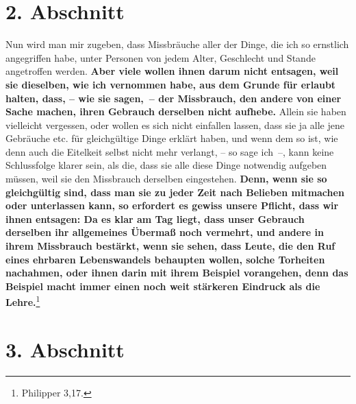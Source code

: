 \section{2. Abschnitt} \label{kap18_ab2}

Nun wird man mir zugeben, dass Missbräuche aller der Dinge, die ich so ernstlich
angegriffen habe, unter Personen von jedem Alter, Geschlecht und Stande
angetroffen werden. \label{ref:18_02_einwand}\textbf{Aber viele wollen ihnen
darum nicht entsagen, weil
sie
dieselben, wie ich vernommen habe, aus dem Grunde für erlaubt halten, dass, --
wie sie sagen,~-- der Missbrauch, den andere von einer Sache machen, ihren
Gebrauch derselben nicht aufhebe.} Allein sie haben vielleicht vergessen, oder
wollen es sich nicht einfallen lassen, dass sie ja alle jene Gebräuche etc. für
gleichgültige Dinge erklärt haben, und wenn dem so ist, wie denn auch die
Eitelkeit selbst nicht mehr verlangt, -- so sage ich~--, kann keine Schlussfolge
klarer sein, als die, dass sie alle diese Dinge notwendig aufgeben müssen, weil
sie den Missbrauch derselben eingestehen. \textbf{Denn, wenn sie so gleichgültig
sind,
dass man sie zu jeder Zeit nach Belieben mitmachen oder unterlassen kann, so
erfordert es gewiss unsere Pflicht, dass wir ihnen entsagen: Da es klar am Tag
liegt, dass unser Gebrauch derselben ihr allgemeines Übermaß noch vermehrt, und
andere in ihrem Missbrauch bestärkt, wenn sie sehen, dass Leute, die den Ruf
eines ehrbaren Lebenswandels behaupten wollen, solche Torheiten nachahmen, oder
ihnen darin mit ihrem Beispiel vorangehen, denn das Beispiel macht immer einen
noch weit stärkeren Eindruck als die Lehre.}\footnote{Philipper 3,17.}

\section{3. Abschnitt} \label{kap18_ab3}

